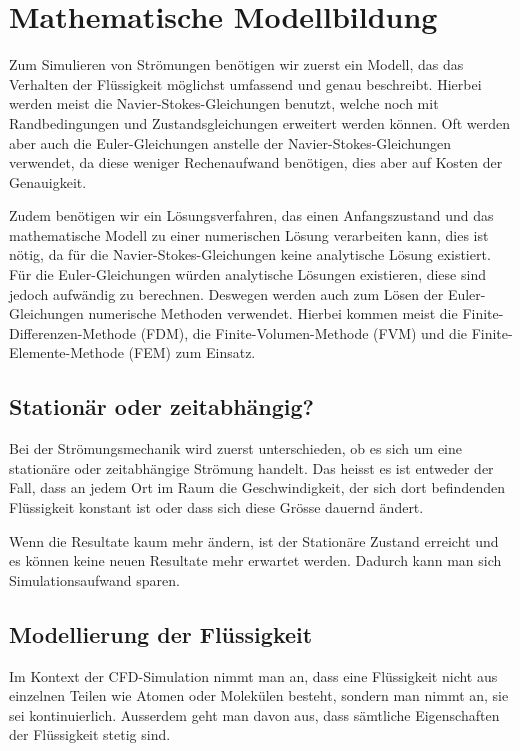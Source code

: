 %
%
%
%
\section{Mathematische Modellbildung
\label{openfoam:section:teil1}}
Zum Simulieren von Strömungen benötigen wir zuerst ein Modell, das das Verhalten der Flüssigkeit möglichst umfassend und genau beschreibt. 
Hierbei werden meist die Navier-Stokes-Gleichungen benutzt, welche noch mit Randbedingungen und Zustandsgleichungen erweitert werden können. 
Oft werden aber auch die Euler-Gleichungen anstelle der Navier-Stokes-Gleichungen verwendet, da diese weniger Rechenaufwand benötigen,
%
dies aber auf Kosten der Genauigkeit.

Zudem benötigen wir ein Lösungsverfahren, das einen Anfangszustand und das mathematische Modell zu einer numerischen Lösung verarbeiten kann, dies ist nötig, da für die Navier-Stokes-Gleichungen keine analytische Lösung existiert.
Für die Euler-Gleichungen würden analytische Lösungen existieren, diese sind jedoch aufwändig zu berechnen.
%
Deswegen werden auch zum Lösen der Euler-Gleichungen numerische Methoden verwendet.
Hierbei kommen meist die Finite-Differenzen-Methode (FDM), die Finite-Volumen-Methode (FVM) und die Finite-Elemente-Methode (FEM) zum Einsatz. 
%
%
%
%
%
%

\subsection{Stationär oder zeitabhängig?}
Bei der Strömungsmechanik wird zuerst unterschieden, ob es sich um eine stationäre oder zeitabhängige Strömung handelt.
%
%
Das heisst es ist entweder der Fall, dass an jedem Ort im Raum die Geschwindigkeit, der sich dort befindenden Flüssigkeit  konstant ist oder dass sich diese Grösse dauernd ändert.

Wenn die Resultate kaum mehr ändern, ist der Stationäre Zustand erreicht und es können keine neuen Resultate mehr erwartet werden.
Dadurch kann man sich Simulationsaufwand sparen.

\subsection{Modellierung der Flüssigkeit}
Im Kontext der CFD-Simulation nimmt man an, dass eine Flüssigkeit nicht aus einzelnen Teilen wie Atomen oder Molekülen besteht, sondern man nimmt an, sie sei kontinuierlich. 
Ausserdem geht man davon aus, dass sämtliche Eigenschaften der Flüssigkeit stetig sind. 

